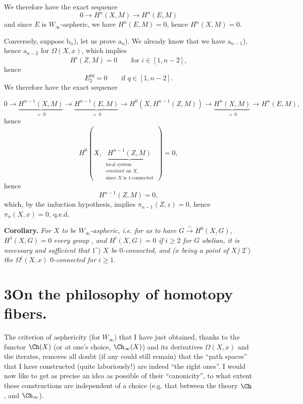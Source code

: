 
We therefore have the exact sequence
\[
0 \longrightarrow H^n(X,M) \longrightarrow H^n(E,M)
\]
and since $E$ is $W_\infty$-aspheric, we have $H^n(E,M) = 0$, hence $H^n(X,M) = 0$.

Conversely, suppose $\mathrm{b}_n$), let us prove $\mathrm{a}_n$). We already know that we have $\mathrm{a}_{n-1}$), hence $\mathrm{a}_{n-2}$ for $\Omega(X,x)$, which implies
\[
H^i(Z,M) = 0 \qquad \text{for } i \in [1,n-2],
\]
hence
\[
E_2^{pq} = 0 \qquad \text{if } q \in [1,n-2].
\]
We therefore have the exact sequence

\[
0 \longrightarrow \underbrace{H^{n-1}(X,M)}_{=\,0} \longrightarrow \underbrace{H^{n-1}(E,M)}_{=\,0} \longrightarrow H^0(X,H^{n-1}(Z,M)) \longrightarrow \underbrace{H^n(X,M)}_{=\,0} \longrightarrow H^n(E,M),
\]
hence
\[
H^0(X,\ \underbrace{H^{n-1}(Z,M)}_{\begin{array}{l}\text{local system}\\ \textit{constant}\text{ on } X,\\ \text{since } X \text{ is 1-connected}\end{array}}\ ) = 0,
\]
hence
\[
H^{n-1}(Z,M) = 0,
\]
which, by the induction hypothesis, implies $\pi_{n-1}(Z,z) = 0$, hence $\pi_n(X,x) = 0$, q.e.d.

\textbf{Corollary.} \textit{For $X$ to be $W_\infty$-aspheric, i.e. for us to have $G \xrightarrow{\ \sim\ } H^0(X,G)$, $H^1(X,G) = 0$} \textit{every group} \textit{, and $H^i(X,G) = 0$ if $i \geq 2$ for $G$ abelian, it is necessary and sufficient that} $1^\circ$) \textit{$X$ be} $0$\textit{-connected, and ($x$ being a point of $X$)} $2^\circ$) \textit{the $\Omega^i(X,x)$} $0$\textit{-connected for $i \geq 1$.}


\section*{3\quad On the philosophy of homotopy fibers.}

The criterion of asphericity (for $W_\infty$) that I have just obtained, thanks to the functor $\Ch(X)$ (or at one's choice, $\Ch_\infty(X)$) and its derivatives $\Omega(X,x)$ and the iterates, removes all doubt (if any could still remain) that the ``path spaces'' that I have constructed (quite laboriously!) are indeed ``the right ones''. I would now like to get as precise an idea as possible of their ``canonicity'', to what extent these constructions are independent of a choice (e.g. that between the theory $\Ch$, and $\Ch_\infty$). %

